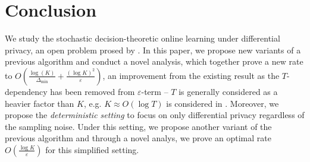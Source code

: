 \section{Conclusion}
\label{sec:conclusion}
We study the stochastic decision-theoretic online learning under differential privacy, an open problem prosed by \citet{hu2024open}.
In this paper, we propose new variants of a previous algorithm and conduct a novel analysis, which together prove a new rate to $O\left(\frac{\log(K)}{\Delta_{\min}} + \frac{(\log K)^2}{\varepsilon}\right)$, an improvement from the existing result as the $T$-dependency has been removed from $\varepsilon$-term -- $T$ is generally considered as a heavier factor than $K$, e.g. $K\approx O(\log T)$ is considered in \citet{hu2024open}.
Moreover, we propose the \textit{deterministic setting} to focus on only differential privacy regardless of the sampling noise.
Under this setting, we propose another variant of the previous algorithm and through a novel analys, we prove an optimal rate $O\left(\frac{ \log K}{\varepsilon}\right)$ for this simplified setting.